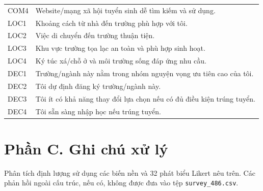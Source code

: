 \begin{longtable}{p{1.3cm}p{11.3cm}}
COM4 & Website/mạng xã hội tuyển sinh dễ tìm kiếm và sử dụng.\\
LOC1 & Khoảng cách từ nhà đến trường phù hợp với tôi.\\
LOC2 & Việc di chuyển đến trường thuận tiện.\\
LOC3 & Khu vực trường tọa lạc an toàn và phù hợp sinh hoạt.\\
LOC4 & Ký túc xá/chỗ ở và môi trường sống đáp ứng nhu cầu.\\
DEC1 & Trường/ngành này nằm trong nhóm nguyện vọng ưu tiên cao của tôi.\\
DEC2 & Tôi dự định đăng ký trường/ngành này.\\
DEC3 & Tôi ít có khả năng thay đổi lựa chọn nếu có đủ điều kiện trúng tuyển.\\
DEC4 & Tôi sẵn sàng nhập học nếu trúng tuyển.\\\bottomrule
\end{longtable}

\section*{Phần C. Ghi chú xử lý}
Phân tích định lượng sử dụng các biến nền và 32 phát biểu Likert nêu trên. Các phản hồi ngoài cấu trúc, nếu có, không được đưa vào tệp \texttt{survey\_486.csv}.
